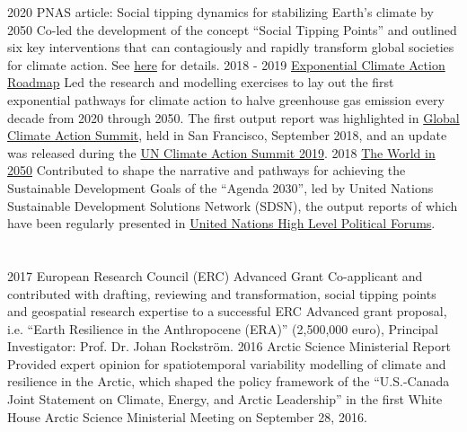 \documentclass[]{friggeri-cv} %
\begin{document}
\begin{entrylist}
\entry
{\small{2020}}
{PNAS article: Social tipping dynamics for stabilizing Earth’s climate by 2050}
{}
{Co-led the development of the concept ``Social Tipping Points'' and outlined six key interventions that can contagiously and rapidly transform global societies for climate action. See \href{http://www.pnas.org/content/early/2020/01/14/1900577117.abstract}{here} for details.}
\entry
{\small{2018 - 2019}}
{\href{https://exponentialroadmap.org}{Exponential Climate Action Roadmap}} 
{}
{Led the research and modelling exercises to lay out the first exponential pathways for climate action to halve greenhouse gas emission every decade from 2020 through 2050. The first output report was highlighted in \href{https://www.globalclimateactionsummit.org}{Global Climate Action Summit}, held in San Francisco, September 2018, and an update was released during the \href{https://www.un.org/en/climatechange/un-climate-summit-2019.shtml}{UN Climate Action Summit 2019}.}
\entry
{\small{2018}}
{\href{http://www.iiasa.ac.at/web/home/research/twi/TWI2050.html}{The World in 2050}} 
{}
{Contributed to shape the narrative and pathways for achieving the Sustainable Development Goals of the ``Agenda 2030'', led by United Nations Sustainable Development Solutions Network (SDSN), the output reports of which have been regularly presented in \href{https://sustainabledevelopment.un.org/hlpf/2018}{United Nations High Level Political Forums}.}
\end{entrylist}
\section{}
\begin{entrylist}
\entry
{\small{2017}}
{European Research Council (ERC) Advanced Grant} 
{}
{Co-applicant and contributed with drafting, reviewing and transformation, social tipping points and geospatial research expertise to a successful ERC Advanced grant proposal, i.e. ``Earth Resilience in the Anthropocene (ERA)'' (2,500,000 euro), Principal Investigator: Prof. Dr. Johan Rockström.}
\entry
{\small{2016}}
{Arctic Science Ministerial Report} 
{}
{Provided expert opinion for spatiotemporal variability modelling of climate and resilience in the Arctic, which shaped the policy framework of the ``U.S.-Canada Joint Statement on Climate, Energy, and Arctic Leadership'' in the first White House Arctic Science Ministerial Meeting on September 28, 2016.}
\end{entrylist}
\end{document}
